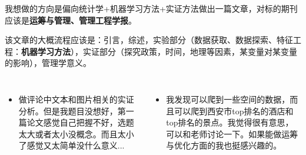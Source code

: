 \documentclass[10pt]{beamer}
\begin{document}
\begin{frame}
    我想做的方向是偏向统计学+机器学习方法+实证方法做出一篇文章，对标的期刊应该是\textbf{运筹与管理、管理工程学报}。
    
    该文章的大概流程应该是：引言，综述，实验部分（数据获取、数据探索、特征工程：\textbf{机器学习方法}），实证部分（探究政策，时间，地理等因素，某变量对某变量的影响），管理学意义。
    \begin{figure}[H]
    \end{figure}
    \begin{columns}
        \begin{itemize}
            \item 做评论中文本和图片相关的实证分析。但是我题目没想好，第一篇论文感觉自己把握不好，选题太大或者太小没概念。而且太小了感觉又太简单没什么意义...
        \end{itemize}
            
        \begin{itemize}
            \item 我发现可以爬到一些空间的数据，而且可以爬到西安市top排名的酒店和top排名的景点。我觉得很有意思，可以和老师讨论一下。如果能做运筹与优化方面的我也挺感兴趣的。
        \end{itemize}
    \end{columns}
\end{frame}
\end{document}
